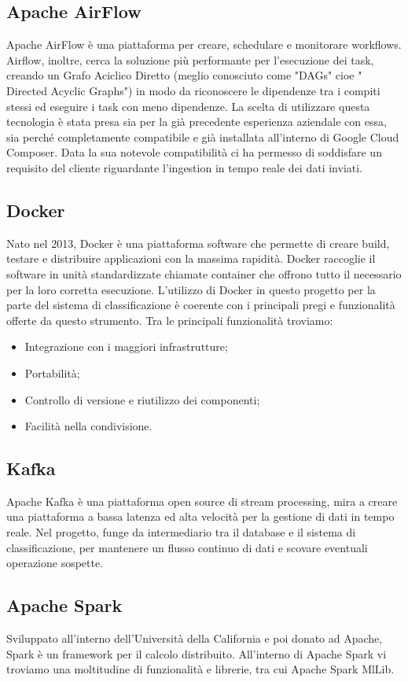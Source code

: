 \subsection{Apache AirFlow}
Apache AirFlow è una piattaforma per creare, schedulare e monitorare \gls{workflows}. Airflow, inoltre, cerca la soluzione più performante per l'esecuzione dei task, creando un Grafo Aciclico Diretto (meglio conosciuto come "\gls{DAGs}" cioe " Directed Acyclic Graphs") in modo da riconoscere le dipendenze tra i compiti stessi ed eseguire i task con meno dipendenze.
La scelta di utilizzare questa tecnologia è stata presa sia per la già precedente esperienza aziendale con essa, sia perché completamente compatibile e già installata all'interno di Google Cloud Composer. Data la sua notevole compatibilità ci ha permesso di soddisfare un requisito del cliente riguardante l'ingestion in tempo reale dei dati inviati.
\subsection{Docker}
Nato nel 2013, Docker è una piattaforma software che permette di creare build, testare e distribuire applicazioni con la massima rapidità. Docker raccoglie il software in unità standardizzate chiamate container che offrono tutto il necessario per la loro corretta esecuzione. L'utilizzo di Docker in questo progetto per la parte del sistema di classificazione è coerente con i principali pregi e funzionalità offerte da questo strumento.
Tra le principali funzionalità troviamo:
\begin{itemize}
	\item Integrazione con i maggiori infrastrutture;
	\item Portabilità;
	\item Controllo di versione e riutilizzo dei componenti;
	\item Facilità nella condivisione.
\end{itemize}
\subsection{Kafka}
Apache Kafka è una piattaforma open source di stream processing, mira a creare una piattaforma a bassa latenza ed alta velocità per la gestione di dati in tempo reale.
Nel progetto, funge da intermediario tra il database e il sistema di classificazione, per mantenere un flusso continuo di dati e scovare eventuali operazione sospette.
\subsection{Apache Spark}
Sviluppato all'interno dell'Università della California e poi donato ad Apache, Spark è un framework per il calcolo distribuito. 
All'interno di Apache Spark vi troviamo una moltitudine di funzionalità e librerie, tra cui Apache Spark MlLib.
